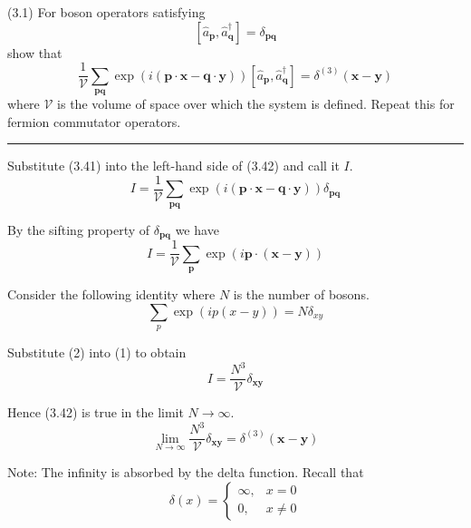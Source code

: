 \documentclass[12pt]{article}
\begin{document}
(3.1)
For boson operators satisfying
\begin{equation*}
\left[\hat a_{\mathbf p},\hat a_{\mathbf q}^\dag\right]=\delta_\mathbf{pq}
\tag{3.41}
\end{equation*}
show that
\begin{equation*}
\frac{1}{\mathcal V}\sum_\mathbf{pq}
\exp(i(\mathbf p\cdot\mathbf x-\mathbf q\cdot\mathbf y))
\left[\hat a_{\mathbf p},\hat a_{\mathbf q}^\dag\right]
=\delta^{(3)}(\mathbf x-\mathbf y)
\tag{3.42}
\end{equation*}
where $\mathcal V$ is the volume of space over which the system
is defined.
Repeat this for fermion commutator operators.

\bigskip
\hrule

\bigskip
Substitute (3.41) into the left-hand side of (3.42) and call it $I$.
\begin{equation*}
I=\frac{1}{\mathcal V}\sum_\mathbf{pq}
\exp(i(\mathbf p\cdot\mathbf x-\mathbf q\cdot\mathbf y))
\delta_\mathbf{pq}
\end{equation*}

By the sifting property of $\delta_\mathbf{pq}$ we have
\begin{equation*}
I=\frac{1}{\mathcal V}\sum_\mathbf{p}
\exp(i\mathbf p\cdot(\mathbf x-\mathbf y))
\tag{1}
\end{equation*}

Consider the following identity where $N$ is the number of bosons.
\begin{equation*}
\sum_p\exp(ip(x-y))=N\delta_{xy}
\tag{2}
\end{equation*}

Substitute (2) into (1) to obtain
\begin{equation*}
I=\frac{N^3}{\mathcal V}\delta_\mathbf{xy}
\end{equation*}

Hence (3.42) is true in the limit $N\rightarrow\infty$.
\begin{equation*}
\lim_{N\rightarrow\infty}\frac{N^3}{\mathcal V}
\delta_\mathbf{xy}
=\delta^{(3)}(\mathbf x-\mathbf y)
\end{equation*}

Note: The infinity is absorbed by the delta function.
Recall that
\begin{equation*}
\delta(x)=\begin{cases}
\infty, & x=0
\\
0, & x\ne0
\end{cases}
\end{equation*}
\end{document}
